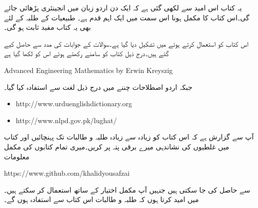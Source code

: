 یہ کتاب اس امید سے لکھی گئی ہے کہ ایک دن اردو زبان میں انجینئری پڑھائی جائے گی۔اس کتاب کا مکمل ہونا اس سمت میں ایک اہم قدم ہے۔ طبیعیات کے طلبہ کے لئے بھی یہ کتاب مفید ثابت ہو گی۔

اس کتاب کو  استعمال کرتے ہوئے  میں تشکیل دیا گیا ہے۔سوالات کے جوابات  کی مدد سے حاصل کیے گئے ہیں۔درج ذیل کتاب کو سامنے رکھتے ہوئے  اس کو لکھا گیا ہے

{
\begin{otherlanguage}{english}
Advanced Engineering Mathematics by Erwin Kreyszig
\end{otherlanguage}
}

جبکہ اردو اصطلاحات چننے میں درج ذیل لغت سے استفادہ  کیا گیا۔
{
\begin{otherlanguage}{english}
\begin{itemize}
\item
http:/\!\!/www.urduenglishdictionary.org
\item
http:/\!\!/www.nlpd.gov.pk/lughat/
\end{itemize}
\end{otherlanguage}
}
آپ سے گزارش ہے کہ اس کتاب کو زیادہ سے زیادہ طلبہ و طالبات تک پہنچائیں اور کتاب میں غلطیوں کی نشاندہی میرے  برقی پتہ پر کریں۔میری تمام کتابوں کی مکمل  معلومات

{
\begin{otherlanguage}{english}
https:/\!\!/www.github.com/khalidyousafzai
\end{otherlanguage}
}

سے حاصل کی جا سکتی ہیں جنہیں آپ مکمل اختیار کے ساتھ استعمال کر سکتے ہیں۔میں امید کرتا ہوں کہ طلبہ و طالبات اس کتاب سے استفادہ ہوں گے۔
\vspace{5mm}

{}


